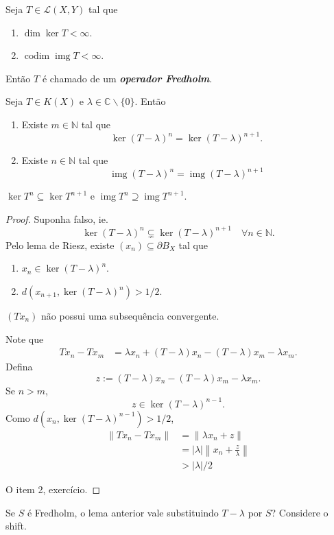 \documentclass[portuguese]{article}
\theoremstyle{definition}
\newcommand{\N}{\mathbb{N}}
\newcommand{\C}{\mathbb{C}}
\DeclareMathOperator{\img}{img}
\begin{document}
\begin{defn}
	Seja $T\in \mathcal{L}(X,Y)$ tal que
	\begin{enumerate}
		\item $\dim \ker T<\infty$.
		\item $\operatorname{codim}\img T<\infty$.
	\end{enumerate}
	Então $T$ é chamado de um \textbf{\textit{operador Fredholm}}. 
\end{defn}
\begin{lema}
	Seja $T\in K(X)$ e $\lambda\in\C\backslash\{0\}$. Então
	\begin{enumerate}
		\item Existe $m\in\N$ tal que 
		\[\ker(T-\lambda)^n=\ker(T-\lambda)^{n+1}.\]
		\item Existe $n\in \N$ tal que
		\[\img(T-\lambda)^n=\img(T-\lambda)^{n+1}\]
	\end{enumerate}
\end{lema}
\begin{obs}
	$\ker T^n\subseteq \ker T^{n+1}$ e $\img T^n\supseteq \img T^{n+1}$.
\end{obs}
\begin{proof}
	Suponha falso, ie.
	\[\ker(T-\lambda)^n\subsetneq\ker(T-\lambda)^{n+1}\quad\forall n\in\N.\]
	Pelo lema de Riesz, existe $(x_n)\subseteq\partial B_X$ tal que
	\begin{enumerate}
		\item  $x_n\in \ker(T-\lambda)^n$.
		\item $d(x_{n+1},\ker(T-\lambda)^n)>1/2$.
	\end{enumerate}
	\begin{af*}
		$(Tx_n)$ não possui uma subsequência convergente.
	\end{af*}
	Note que
	\begin{align*}
		Tx_n-Tx_m&=\lambda x_n+(T-\lambda)x_n-(T-\lambda)x_m-\lambda x_m.
	\end{align*}
	Defina
	\[z:=(T-\lambda)x_n-(T-\lambda)x_m-\lambda x_m.\]
	Se $n>m$,
	\[z\in\ker(T-\lambda)^{n-1}.\]
	Como $d(x_n,\ker(T-\lambda)^{n-1})>1/2$,
	\begin{align*}
		\|Tx_n-Tx_m\|&=\|\lambda x_n+z\|\\
		&=|\lambda|\left\|x_n+\frac{z}{\lambda}\right\|\\
		&>|\lambda|/2
	\end{align*}
	
	{\color{orange} O item 2, exercício.}
\end{proof}
\begin{exer*}
	Se $S$ é Fredholm, o lema anterior vale substituindo $T-\lambda$ por $S$? Considere o shift.
\end{exer*}
\end{document}
